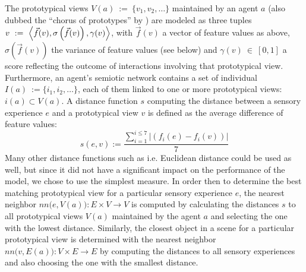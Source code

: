 The prototypical views $V(a)~:=~\{v_1,v_2,\dots\}$ maintained by an
agent $a$ (also dubbed the ``chorus of prototypes'' by
\citealp{edelman95representation}) are modeled as three tuples
$v~:=~\Big{\langle}\vec{f}(v),\sigma\left(\vec{f}(v)\right),\gamma(v)\Big{\rangle}$,
with $\vec{f}(v)$ a vector of feature values as above,
$\sigma\left(\vec{f}(v)\right)$ the variance of feature values (see
below) and $\gamma(v)~\in~[0,1]$ a score reflecting the outcome of
interactions involving that prototypical view. Furthermore, an agent's
semiotic network contains a set of individual
$I(a)~:=\{i_1,i_2,\dots\}$, each of them linked to one or more
prototypical views: $i(a) \subset V(a)$.  A distance function $s$
computing the distance between a sensory experience $e$ and a
prototypical view $v$ is defined as the average difference of feature
values:
$$ s(e,v):=\frac{\sum_{i=1}^{i\leq7}|\left(f_i(e)-f_i(v)\right)|}{7}$$
Many other distance functions such as i.e. Euclidean distance could be
used as well, but since it did not have a significant impact on the
performance of the model, we chose to use the simplest measure. In
order then to determine the best matching prototypical view for a
particular sensory experience $e$, the nearest neighbor
$nn\Big(e,V(a)\Big):E\times V \rightarrow V$ is computed by
calculating the distances $s$ to all prototypical views $V(a)$
maintained by the agent $a$ and selecting the one with the lowest
distance. Similarly, the closest object in a scene for a particular
prototypical view is determined with the nearest neighbor
$nn\Big(v,E(a)\Big):V\times E\rightarrow E$ by computing the distances
to all sensory experiences and also choosing the one with the smallest
distance.

~\\

